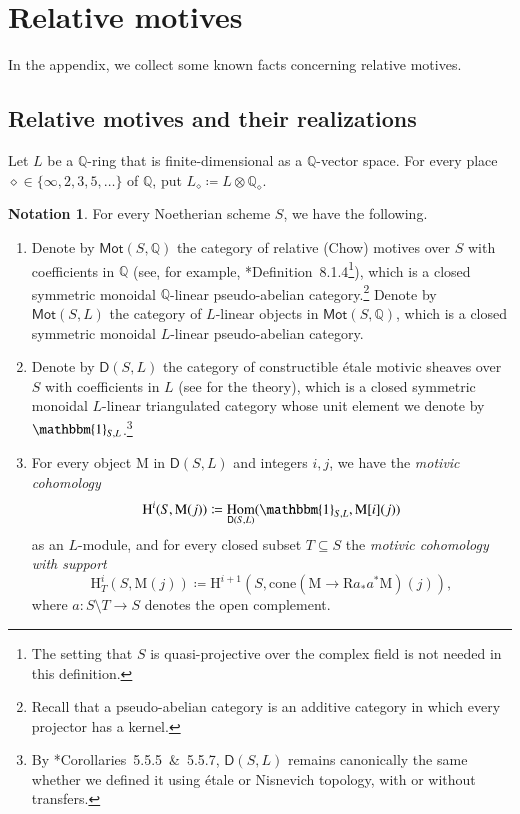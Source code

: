 \documentclass[12pt]{amsart}
\numberwithin{equation}{section}
\theoremstyle{plain}
\theoremstyle{definition}
\newtheorem{notation}[proposition]{Notation}
\theoremstyle{remark}
\renewcommand{\d}[1]{\mathbb{#1}}
\renewcommand{\r}[1]{\mathrm{#1}}
\renewcommand{\sf}[1]{\mathsf{#1}}
\renewcommand{\(}{\left(}
\renewcommand{\)}{\right)}
\newcommand{\dQ}{\d Q}
\newcommand{\rH}{\r H}
\newcommand{\rM}{\r M}
\newcommand{\rR}{\r R}
\newcommand{\sfD}{\sf D}
\newcommand{\Mot}{\sf{Mot}}
\DeclareMathOperator{\Hom}{Hom}
\begin{document}
\appendix












\section{Relative motives}
\label{ss:a}

In the appendix, we collect some known facts concerning relative motives.



\subsection{Relative motives and their realizations}
\label{ss:relative_motive}


Let $L$ be a $\dQ$-ring that is finite-dimensional as a $\dQ$-vector space. For every place $\diamond\in\{\infty,2,3,5,\dots\}$ of $\dQ$, put $L_\diamond\coloneqq L\otimes\dQ_\diamond$.


\begin{notation}\label{no:relative_motivic}
For every Noetherian scheme $S$, we have the following.
\begin{enumerate}
  \item Denote by $\Mot(S,\dQ)$ the category of relative (Chow) motives over $S$ with coefficients in $\dQ$ (see, for example, \cite{MNP13}*{Definition~8.1.4}\footnote{The setting that $S$ is quasi-projective over the complex field is not needed in this definition.}), which is a closed symmetric monoidal $\dQ$-linear pseudo-abelian category.\footnote{Recall that a pseudo-abelian category is an additive category in which every projector has a kernel.} Denote by $\Mot(S,L)$ the category of $L$-linear objects in $\Mot(S,\dQ)$, which is a closed symmetric monoidal $L$-linear pseudo-abelian category.

  \item Denote by $\sfD(S,L)$ the category of constructible \'{e}tale motivic sheaves over $S$ with coefficients in $L$ (see \cite{CD16} for the theory), which is a closed symmetric monoidal $L$-linear triangulated category whose unit element we denote by $\mathbbm{1}_{S,L}$.\footnote{By \cite{CD16}*{Corollaries~5.5.5~\&~5.5.7}, $\sfD(S,L)$ remains canonically the same whether we defined it using \'{e}tale or Nisnevich topology, with or without transfers.}

  \item For every object $\rM$ in $\sfD(S,L)$ and integers $i,j$, we have the \emph{motivic cohomology}
      \[
      \rH^i(S,\rM(j))\coloneqq\Hom_{\sfD(S,L)}(\mathbbm{1}_{S,L},\rM[i](j))
      \]
      as an $L$-module, and for every closed subset $T\subseteq S$ the \emph{motivic cohomology with support}
      \[
      \rH^i_T(S,\rM(j))\coloneqq\rH^{i+1}(S,\r{cone}(\rM\to\rR a_* a^*\rM)(j)),
      \]
      where $a\colon S\setminus T\to S$ denotes the open complement.
\end{enumerate}
\end{notation}
\end{document}
